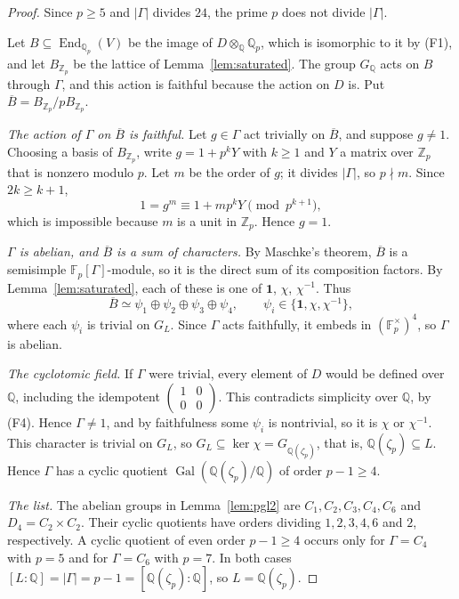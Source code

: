 \documentclass[11pt]{article}
\newcommand{\Q}{\mathbb Q}
\newcommand{\Z}{\mathbb Z}
\newcommand{\F}{\mathbb F}
\DeclareMathOperator{\End}{End}
\DeclareMathOperator{\Gal}{Gal}
\begin{document}
\begin{proof}
Since \(p\geq5\) and \(|\Gamma|\) divides \(24\), the prime \(p\) does
not divide \(|\Gamma|\).

Let \(B\subseteq\End_{\Q_p}(V)\) be the image of
\(D\otimes_{\Q}\Q_p\), which is isomorphic to it by (F1), and let
\(B_{\Z_p}\) be the lattice of Lemma~\ref{lem:saturated}. The group
\(G_{\Q}\) acts on \(B\) through \(\Gamma\), and this action is
faithful because the action on \(D\) is. Put
\(\overline B=B_{\Z_p}/pB_{\Z_p}\).

\emph{The action of \(\Gamma\) on \(\overline B\) is faithful.} Let
\(g\in\Gamma\) act trivially on \(\overline B\), and suppose
\(g\neq1\). Choosing a basis of \(B_{\Z_p}\), write \(g=1+p^kY\) with
\(k\geq1\) and \(Y\) a matrix over \(\Z_p\) that is nonzero modulo
\(p\). Let \(m\) be the order of \(g\); it divides \(|\Gamma|\), so
\(p\nmid m\). Since \(2k\geq k+1\),
\[
 1=g^m\equiv1+mp^kY\pmod{p^{k+1}},
\]
which is impossible because \(m\) is a unit in \(\Z_p\). Hence
\(g=1\).

\emph{\(\Gamma\) is abelian, and \(\overline B\) is a sum of
characters.} By Maschke's theorem, \(\overline B\) is a semisimple
\(\F_p[\Gamma]\)-module, so it is the direct sum of its composition
factors. By Lemma~\ref{lem:saturated}, each of these is one of
\(\mathbf 1\), \(\chi\), \(\chi^{-1}\). Thus
\[
 \overline B\simeq\psi_1\oplus\psi_2\oplus\psi_3\oplus\psi_4,\qquad
 \psi_i\in\{\mathbf 1,\chi,\chi^{-1}\},
\]
where each \(\psi_i\) is trivial on \(G_L\). Since \(\Gamma\) acts
faithfully, it embeds in \((\F_p^\times)^4\), so \(\Gamma\) is abelian.

\emph{The cyclotomic field.} If \(\Gamma\) were trivial, every element
of \(D\) would be defined over \(\Q\), including the idempotent
\(\left(\begin{smallmatrix}1&0\\0&0\end{smallmatrix}\right)\). This
contradicts simplicity over \(\Q\), by (F4). Hence \(\Gamma\neq1\), and
by faithfulness some \(\psi_i\) is nontrivial, so it is \(\chi\) or
\(\chi^{-1}\). This character is trivial on \(G_L\), so
\(G_L\subseteq\ker\chi=G_{\Q(\zeta_p)}\), that is,
\(\Q(\zeta_p)\subseteq L\). Hence \(\Gamma\) has a cyclic quotient
\(\Gal(\Q(\zeta_p)/\Q)\) of order \(p-1\geq4\).

\emph{The list.} The abelian groups in Lemma~\ref{lem:pgl2} are
\(C_1,C_2,C_3,C_4,C_6\) and \(D_4=C_2\times C_2\). Their cyclic
quotients have orders dividing \(1,2,3,4,6\) and \(2\), respectively.
A cyclic quotient of even order \(p-1\geq4\) occurs only for
\(\Gamma=C_4\) with \(p=5\) and for \(\Gamma=C_6\) with \(p=7\). In both
cases \([L:\Q]=|\Gamma|=p-1=[\Q(\zeta_p):\Q]\), so \(L=\Q(\zeta_p)\).
\end{proof}
\end{document}
